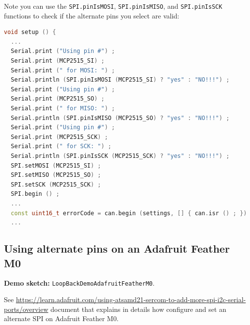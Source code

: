 \documentclass[10pt, a4paper, obeyspaces]{extarticle}
\newcommand \subsectionLabel[2]{\subsection{#1}\label{subsec:#2}}
\begin{document}
Note you can use the \texttt{SPI.pinIsMOSI}, \texttt{SPI.pinIsMISO}, and \texttt{SPI.pinIsSCK} functions to check if the alternate pins you select are valid:
{ \small\begin{lstlisting}[language=c++]
void setup () {
  ...
  Serial.print ("Using pin #") ;
  Serial.print (MCP2515_SI) ;
  Serial.print (" for MOSI: ") ;
  Serial.println (SPI.pinIsMOSI (MCP2515_SI) ? "yes" : "NO!!!") ;
  Serial.print ("Using pin #") ;
  Serial.print (MCP2515_SO) ;
  Serial.print (" for MISO: ") ;
  Serial.println (SPI.pinIsMISO (MCP2515_SO) ? "yes" : "NO!!!") ;
  Serial.print ("Using pin #") ;
  Serial.print (MCP2515_SCK) ;
  Serial.print (" for SCK: ") ;
  Serial.println (SPI.pinIsSCK (MCP2515_SCK) ? "yes" : "NO!!!") ;
  SPI.setMOSI (MCP2515_SI) ;
  SPI.setMISO (MCP2515_SO) ;
  SPI.setSCK (MCP2515_SCK) ;
  SPI.begin () ;
  ...
  const uint16_t errorCode = can.begin (settings, [] { can.isr () ; }) ;
  ...
\end{lstlisting}}




\subsectionLabel{Using alternate pins on an Adafruit Feather M0}{AdafruitFeatherM0AlternatePins}

{\bf Demo sketch: } \texttt{LoopBackDemoAdafruitFeatherM0}.

See \url{https://learn.adafruit.com/using-atsamd21-sercom-to-add-more-spi-i2c-serial-ports/overview} document that explains in details how configure and set an alternate SPI on Adafruit Feather M0.
\end{document}
